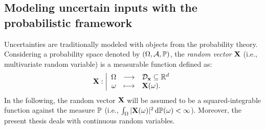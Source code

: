 \subsection{Modeling uncertain inputs with the probabilistic framework}

Uncertainties are traditionally modeled with objects from the probability theory. 
Considering a probability space denoted by $(\Omega, \iA, \P)$, the \textit{random vector} $\bX$ (i.e., multivariate random variable) is a measurable function defined as: 
\begin{equation}
\bX : \bigg|
\begin{array}{rcl}
    \Omega & \longrightarrow & \iD_{\bx} \subseteq \R^d\\
    \omega & \longmapsto & \bX(\omega).
\end{array}
\end{equation}
In the following, the random vector $\bX$ will be assumed to be a squared-integrable function against the measure $\P$ (i.e., $\int_{\Omega} |\bX(\omega)|^2 \,\dd \P(\omega) < \infty$). 
Moreover, the present thesis deals with continuous random variables.

